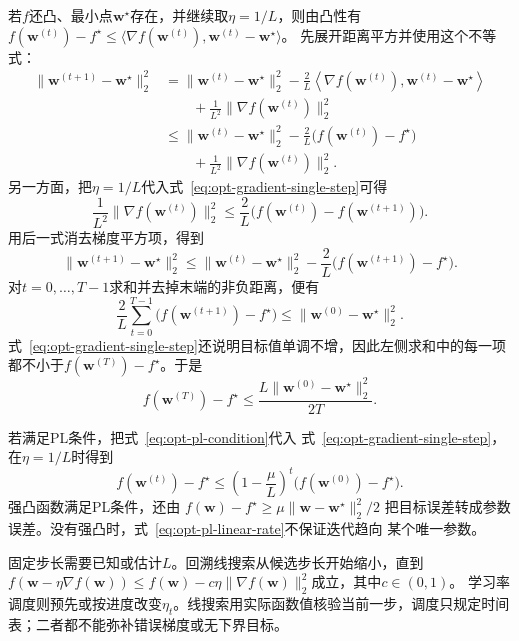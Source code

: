 若$f$还凸、最小点$\bm{w}^{\star}$存在，并继续取$\eta=1/L$，则由凸性有
$f(\bm{w}^{(t)})-f^\star
\leq\langle\nabla f(\bm{w}^{(t)}),\bm{w}^{(t)}-\bm{w}^{\star}\rangle$。
先展开距离平方并使用这个不等式：
\begin{align*}
  \lVert\bm{w}^{(t+1)}-\bm{w}^{\star}\rVert_2^2
  &=
  \lVert\bm{w}^{(t)}-\bm{w}^{\star}\rVert_2^2
  -\frac{2}{L}
  \left\langle\nabla f(\bm{w}^{(t)}),
  \bm{w}^{(t)}-\bm{w}^{\star}\right\rangle\\
  &\qquad
  +\frac{1}{L^2}\lVert\nabla f(\bm{w}^{(t)})\rVert_2^2\\
  &\leq
  \lVert\bm{w}^{(t)}-\bm{w}^{\star}\rVert_2^2
  -\frac{2}{L}\bigl(f(\bm{w}^{(t)})-f^\star\bigr)\\
  &\qquad
  +\frac{1}{L^2}\lVert\nabla f(\bm{w}^{(t)})\rVert_2^2.
\end{align*}
另一方面，把$\eta=1/L$代入式~\eqref{eq:opt-gradient-single-step}可得
\[
  \frac{1}{L^2}\lVert\nabla f(\bm{w}^{(t)})\rVert_2^2
  \leq
  \frac{2}{L}\bigl(
  f(\bm{w}^{(t)})-f(\bm{w}^{(t+1)})\bigr).
\]
用后一式消去梯度平方项，得到
\[
  \lVert\bm{w}^{(t+1)}-\bm{w}^{\star}\rVert_2^2
  \leq
  \lVert\bm{w}^{(t)}-\bm{w}^{\star}\rVert_2^2
  -\frac{2}{L}\bigl(f(\bm{w}^{(t+1)})-f^\star\bigr).
\]
对$t=0,\ldots,T-1$求和并去掉末端的非负距离，便有
\[
  \frac{2}{L}\sum_{t=0}^{T-1}
  \bigl(f(\bm{w}^{(t+1)})-f^\star\bigr)
  \leq
  \lVert\bm{w}^{(0)}-\bm{w}^{\star}\rVert_2^2.
\]
式~\eqref{eq:opt-gradient-single-step}还说明目标值单调不增，因此左侧求和中的每一项
都不小于$f(\bm{w}^{(T)})-f^\star$。于是
\begin{equation}
  f(\bm{w}^{(T)})-f^\star
  \leq\frac{L\lVert\bm{w}^{(0)}-\bm{w}^{\star}\rVert_2^2}{2T}.
  \label{eq:opt-convex-gradient-rate}
\end{equation}

若满足PL条件，把式~\eqref{eq:opt-pl-condition}代入
式~\eqref{eq:opt-gradient-single-step}，在$\eta=1/L$时得到
\begin{equation}
  f(\bm{w}^{(t)})-f^\star
  \leq
  \left(1-\frac{\mu}{L}\right)^t
  \bigl(f(\bm{w}^{(0)})-f^\star\bigr).
  \label{eq:opt-pl-linear-rate}
\end{equation}
强凸函数满足PL条件，还由
$f(\bm{w})-f^\star\geq\mu\lVert\bm{w}-\bm{w}^{\star}\rVert_2^2/2$
把目标误差转成参数误差。没有强凸时，式~\eqref{eq:opt-pl-linear-rate}不保证迭代趋向
某个唯一参数。

固定步长需要已知或估计$L$。回溯线搜索从候选步长开始缩小，直到
$f(\bm{w}-\eta\nabla f(\bm{w}))\leq
f(\bm{w})-c\eta\lVert\nabla f(\bm{w})\rVert_2^2$成立，其中$c\in(0,1)$。
学习率调度则预先或按进度改变$\eta_t$。线搜索用实际函数值核验当前一步，调度只规定时间
表；二者都不能弥补错误梯度或无下界目标。

